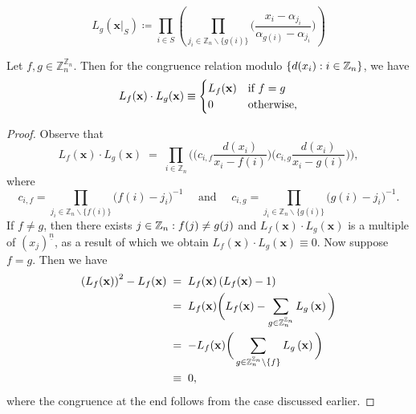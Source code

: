 \[
L_{g}(\mathbf{x}|_{S})\coloneq\prod_{i\in S}\left(\prod_{j_{i}\in\mathbb{Z}_{n}\backslash\{g(i)\}}\bigg(\frac{x_{i}-\alpha_{j_{i}}}{\alpha_{g(i)}-\alpha_{j_{i}}}\bigg)\right)
\]
\begin{proposition}
 \label{prop:Orthogonality}
 Let $f,g \in\mathbb{Z}_{n}^{\mathbb{Z}_{n}}$. Then for the congruence relation modulo $\{d(x_{i}):i \in {\mathbb Z}_n\}$, we have
\[
L_{f}({\bf x})\cdot L_{g}({\bf x})\equiv\begin{cases}
L_{f}({\bf x}) & \text{if }f=g\\
0 & \text{otherwise,}
\end{cases}
\]
\end{proposition}
\begin{proof} Observe that
\[
L_{f}(\mathbf{x})\cdot L_{g}(\mathbf{x})\;=\;\prod_{i\in\mathbb{Z}_{n}}\bigg(\big(c_{i,f}\frac{d(x_{i})}{x_{i}-f(i)}\big)\big(c_{i,g}\frac{d(x_{i})}{x_{i}-g(i)}\big)\bigg),
\]
where
\[
c_{i,f}=\prod_{j_{i}\in\mathbb{Z}_{n}\backslash\{f(i)\}}\big(f(i)-j_{i}\big)^{-1}\quad\text{ and }\quad c_{i,g}=\prod_{j_{i}\in\mathbb{Z}_{n}\backslash\{g(i)\}}\big(g(i)-j_{i}\big)^{-1}.
\]
If $f \neq g$, then there exists $j \in {\mathbb Z}_n:f(j)\neq g(j)$ and $L_{f}(\mathbf{x})\cdot L_{g}(\mathbf{x})$ is a multiple of $(x_{j})^{\underline{n}}$,
as a result of which we obtain $L_{f}(\mathbf{x})\cdot L_{g}(\mathbf{x}) \equiv 0$. Now suppose $f = g$. Then we have
\begin{align*}
\left(L_{f}(\mathbf{x})\right)^{2}-L_{f}(\mathbf{x})\; & =\;L_{f}(\mathbf{x})\left(L_{f}(\mathbf{x})-1\right)\\
 & =\;L_{f}(\mathbf{x})\bigg(L_{f}(\mathbf{x})-\sum_{g\in\mathbb{Z}_{n}^{\mathbb{Z}_{n}}}L_{g}\left({\bf x}\right)\bigg)\\
 & =\;-L_{f}(\mathbf{x})\bigg(\sum_{g\in\mathbb{Z}_{n}^{\mathbb{Z}_{n}}\setminus\{f\}}L_{g}\left({\bf x}\right)\bigg)\\
 & \equiv\;0,
\end{align*}
where the congruence at the end follows from the case discussed earlier.
\end{proof}
